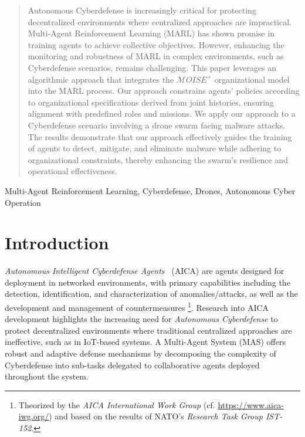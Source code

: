 \documentclass[conference]{IEEEtran}
\begin{document}


\maketitle

\begin{abstract}
    Autonomous Cyberdefense is increasingly critical for protecting decentralized environments where centralized approaches are impractical. Multi-Agent Reinforcement Learning (MARL) has shown promise in training agents to achieve collective objectives. However, enhancing the monitoring and robustness of MARL in complex environments, such as Cyberdefense scenarios, remains challenging. This paper leverages an algorithmic approach that integrates the $\mathcal{M}OISE^+$ organizational model into the MARL process. Our approach constrains agents' policies according to organizational specifications derived from joint histories, ensuring alignment with predefined roles and missions. We apply our approach to a Cyberdefense scenario involving a drone swarm facing malware attacks. The results demonstrate that our approach effectively guides the training of agents to detect, mitigate, and eliminate malware while adhering to organizational constraints, thereby enhancing the swarm's resilience and operational effectiveness.
\end{abstract}

\begin{IEEEkeywords}
    Multi-Agent Reinforcement Learning, Cyberdefense, Drones, Autonomous Cyber Operation
\end{IEEEkeywords}


\section{Introduction}
\label{sec:introduction}

\textit{Autonomous Intelligent Cyberdefense Agents}~\cite{Kott2023} (AICA) are agents designed for deployment in networked environments, with primary capabilities including the detection, identification, and characterization of anomalies/attacks, as well as the development and management of countermeasures%
\footnote{
    Theorized by the \textit{AICA International Work Group} (cf. \url{https://www.aica-iwg.org/}) and based on the results of NATO's \textit{Research Task Group IST-152}.
}.
Research into AICA development highlights the increasing need for \textit{Autonomous Cyberdefense} to protect decentralized environments where traditional centralized approaches are ineffective, such as in IoT-based systems. A Multi-Agent System (MAS) offers robust and adaptive defense mechanisms by decomposing the complexity of Cyberdefense into sub-tasks delegated to collaborative agents deployed throughout the system.
\end{document}
